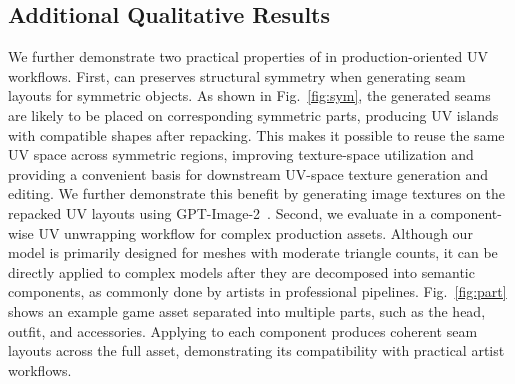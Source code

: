 \subsection{Additional Qualitative Results}
\label{sec:additional_results}

We further demonstrate two practical properties of \methodname{} in production-oriented UV workflows.
First, \methodname{} can preserves structural symmetry when generating seam layouts for symmetric objects. 
As shown in Fig.~\ref{fig:sym}, the generated seams are likely to be placed on corresponding symmetric parts, producing UV islands with compatible shapes after repacking. 
This makes it possible to reuse the same UV space across symmetric regions, improving texture-space utilization and providing a convenient basis for downstream UV-space texture generation and editing. 
We further demonstrate this benefit by generating image textures on the repacked UV layouts using GPT-Image-2~\cite{openai2026gptimage2}.
Second, we evaluate \methodname{} in a component-wise UV unwrapping workflow for complex production assets. 
Although our model is primarily designed for meshes with moderate triangle counts, it can be directly applied to complex models after they are decomposed into semantic components, as commonly done by artists in professional pipelines. 
Fig.~\ref{fig:part} shows an example game asset separated into multiple parts, such as the head, outfit, and accessories. 
Applying \methodname{} to each component produces coherent seam layouts across the full asset, demonstrating its compatibility with practical artist workflows.


